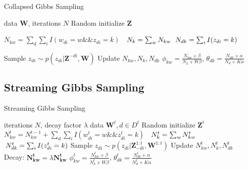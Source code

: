 \documentclass{article}
\begin{document}
\begin{algorithm}[tb]
   \caption{Collapsed Gibbs Sampling}
   \label{alg:CGS}
\begin{algorithmic}
    data $\bm{W}$, iterations $N$
   \STATE Random initialize $\bm{Z}$

	   \STATE $N_{kw}=\sum_d\sum_i I(w_{di}=w \&\& z_{di}=k)$ 
	   \STATE $\phantom{N_{kw}}\mathllap{N_k}=\sum_w N_{kw}$
	   \STATE $\phantom{N_{kw}}\mathllap{N_{dk}}=\sum_i I(z_{di}=k)$
   \ENDFOR   
	
	  			\STATE Sample $z_{di}\sim p(z_{di}|\bm{Z}^{-di},\bm{W})$
  				\STATE Update $N_{kw}, N_k, N_{dk}$
  			\ENDFOR
  		\ENDFOR
   \ENDFOR
   		$\phi_{kw}=\frac{N_{kw}+\beta}{N_{k}+W\beta}$,
		$\theta_{dk}=\frac{N_{dk}+\alpha}{N_{d}+K\alpha}$
\end{algorithmic}
\end{algorithm}

\subsection{Streaming Gibbs Sampling}

\begin{algorithm}[tb]
   \caption{Streaming Gibbs Sampling} 
   \label{alg:SGS}
\begin{algorithmic}
    iterations $N$, decay factor $\lambda$
	    data $\bm{W}^t, d\in D^t $
	   \STATE Random initialize $\bm{Z}^t$
		   \STATE $N_{kw}^{t}=N_{kw}^{t-1}+\sum_{d}\sum_i I(w_{di}^t=w \&\& z_{di}^t=k)$
		   \STATE $\phantom{N_{kw}^{t}}\mathllap{N_k^{t}}=\sum_w N_{kw}^{t}$
		   \STATE $\phantom{N_{kw}^{t}}\mathllap{N_{dk}^t}=\sum_i I(z_{di}^t=k)$
	   \ENDFOR	   
	  		  			\STATE Sample $z_{di}\sim p(z_{di}|\bm{Z}_{-di}^{1:t},\bm{W}^{1:t})$
  			  			\STATE Update $N_{kw}^{t}, N_k^{t}, N_{dk}^t$
  			  		\ENDFOR
  		  		\ENDFOR
	   \ENDFOR
	   \STATE Decay: $\bm{N_{kw}^{t}}=\lambda \bm{N_{kw}^{t}}$
 	   		$\phi_{kw}^t=\frac{N_{kw}^t+\beta}{N_{k}^t+W\beta}$,
			$\theta_{dk}^t=\frac{N_{dk}^t+\alpha}{N_{d}^t+K\alpha}$  		   		
   \ENDFOR   
\end{algorithmic}
\end{algorithm}
\end{document}
